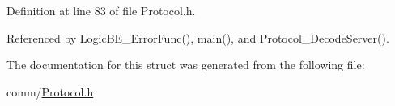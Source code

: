 Definition at line 83 of file Protocol.\+h.



Referenced by Logic\+B\+E\+\_\+\+Error\+Func(), main(), and Protocol\+\_\+\+Decode\+Server().



The documentation for this struct was generated from the following file\+:\begin{DoxyCompactItemize}
\item 
comm/\hyperlink{Protocol_8h}{Protocol.\+h}\end{DoxyCompactItemize}
